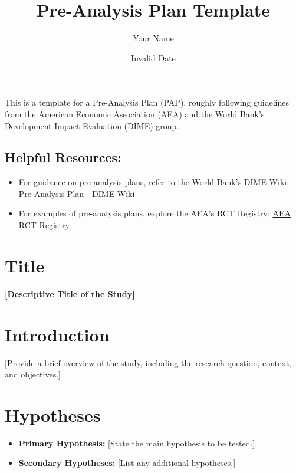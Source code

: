 \documentclass[
  letterpaper,
  DIV=11,
  numbers=noendperiod]{scrartcl}
\title{Pre-Analysis Plan Template}
\author{Your Name}
\date{Invalid Date}
\providecommand{\tightlist}{%
  \setlength{\itemsep}{0pt}\setlength{\parskip}{0pt}}\usepackage{longtable,booktabs,array}
\renewcommand*\contentsname{Table of contents}
\newcommand\contentsname{Table of contents}
\begin{document}
\maketitle

\renewcommand*\contentsname{Table of contents}
{
\hypersetup{linkcolor=}
\setcounter{tocdepth}{3}
\tableofcontents
}

This is a template for a Pre-Analysis Plan (PAP), roughly following
guidelines from the American Economic Association (AEA) and the World
Bank's Development Impact Evaluation (DIME) group.

\subsection{Helpful Resources:}\label{helpful-resources}

\begin{itemize}
\item
  For guidance on pre-analysis plans, refer to the World Bank's DIME
  Wiki:
  \href{https://dimewiki.worldbank.org/Pre-Analysis_Plan}{Pre-Analysis
  Plan - DIME Wiki}
\item
  For examples of pre-analysis plans, explore the AEA's RCT Registry:
  \href{https://www.socialscienceregistry.org/}{AEA RCT Registry}
\end{itemize}

\section{Title}\label{title}

\textbf{{[}Descriptive Title of the Study{]}}

\section{Introduction}\label{introduction}

{[}Provide a brief overview of the study, including the research
question, context, and objectives.{]}

\section{Hypotheses}\label{hypotheses}

\begin{itemize}
\tightlist
\item
  \textbf{Primary Hypothesis:} {[}State the main hypothesis to be
  tested.{]}
\item
  \textbf{Secondary Hypotheses:} {[}List any additional hypotheses.{]}
\end{itemize}
\end{document}
